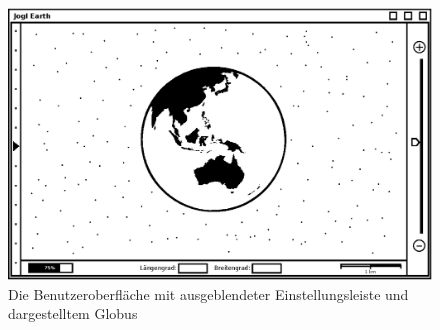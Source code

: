 \documentclass[10pt]{scrreprt}
\begin{document}
\begin{figure}
	\centering
	\includegraphics[scale=0.9]{GUI-Ausgeblendet.eps}
	\caption{Die Benutzeroberfläche mit ausgeblendeter Einstellungsleiste und dargestelltem Globus}
\end{figure}
\end{document}
